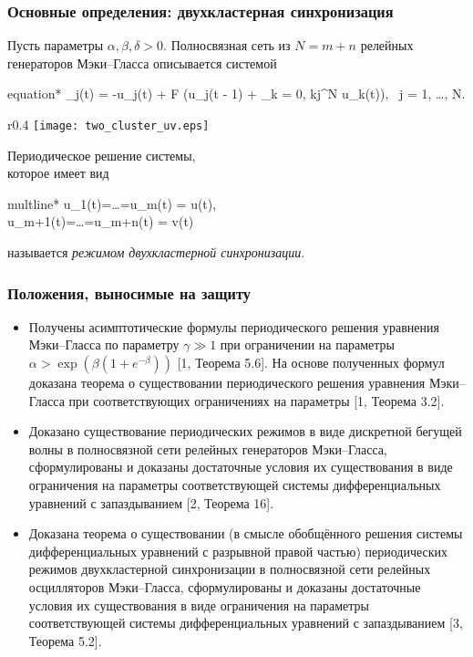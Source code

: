 \begin{frame}
	\frametitle{Основные определения: двухкластерная синхронизация}
	
	Пусть параметры $\alpha, \beta, \delta > 0$. Полносвязная сеть из $N = m + n$ релейных генераторов Мэки--Гласса описывается системой
	\small	
	\begin{empheq}[box=\myeq]{equation*}
		_j(t) = -\beta u_j(t) + \alpha F \bigg(u_j(t - 1) + \delta \sum\limits_{k = 0, k\neq j}^N u_k(t)\bigg), \ j = 1, \dots, N.
	\end{empheq}
	\normalsize
	
	\begin{wrapfigure}{r}{0.4\textwidth} 
		\vspace{-22pt} 
		\centering
		\texttt{[image: two\_cluster\_uv.eps]}
	\end{wrapfigure}
	
	Периодическое решение системы, \\которое имеет вид 
	\small	
	\begin{empheq}[box=\myeq]{multline*}
		u_1(t)=\ldots=u_m(t) = u(t),\\u_{m+1}(t)=\ldots=u_{m+n}(t) = v(t)
	\end{empheq}
	\normalsize
	называется \emph{режимом двухкластерной синхронизации}.

\end{frame}

\begin{frame}
    \frametitle{Положения, выносимые на защиту}

	\small
    \begin{itemize}
    	\item Получены асимптотические формулы периодического решения уравнения Мэки--Гласса по параметру $\gamma \gg 1$ при ограничении на параметры $\alpha > \exp\left(\beta(1 + e^{-\beta})\right)$ [1, Теорема 5.6]. На основе полученных формул доказана теорема о существовании периодического решения уравнения Мэки--Гласса при соответствующих ограничениях на параметры [1, Теорема 3.2].
    	\item Доказано существование периодических режимов в виде дискретной бегущей волны в полносвязной сети релейных генераторов Мэки--Гласса, сформулированы и доказаны достаточные условия их существования в виде ограничения на параметры соответствующей системы дифференциальных уравнений с запаздыванием [2, Теорема 16].
    	\item Доказана теорема о существовании (в смысле обобщённого решения системы дифференциальных уравнений с разрывной правой частью) периодических режимов двухкластерной синхронизации в полносвязной сети релейных осцилляторов Мэки--Гласса, сформулированы и доказаны достаточные условия их существования в виде ограничения на параметры соответствующей системы дифференциальных уравнений с запаздыванием [3, Теорема 5.2].
    \end{itemize}
    \normalsize
\end{frame}

